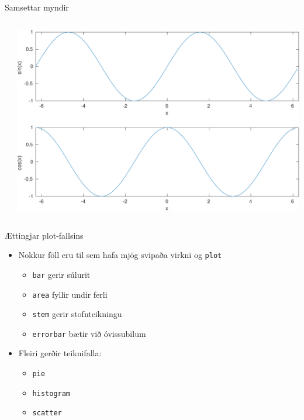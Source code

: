\documentclass{beamer}
\begin{document}
\begin{frame}[fragile]{Samsettar myndir}
    \begin{columns}
        \inputminted[frame=lines, label=subplotexample.m, fontsize=\scriptsize]{matlab}{../T1a/Code/subplotexample.m}
        \includegraphics[width=\textwidth]{../T1a/Pics/subplot-example.pdf}
    \end{columns}
\end{frame}

\begin{frame}{Ættingjar plot-fallsins}
    \begin{itemize}
        \item Nokkur föll eru til sem hafa mjög svipaða virkni og \texttt{plot}
        \begin{itemize}
            \item \texttt{bar} gerir súlurit
            \item \texttt{area} fyllir undir ferli
            \item \texttt{stem} gerir stofnteikningu
            \item \texttt{errorbar} bætir við óvissubilum
        \end{itemize}
        \item Fleiri gerðir teiknifalla:
        \begin{itemize}
            \item \texttt{pie}
            \item \texttt{histogram}
            \item \texttt{scatter}
        \end{itemize}
    \end{itemize}
\end{frame}
\end{document}
